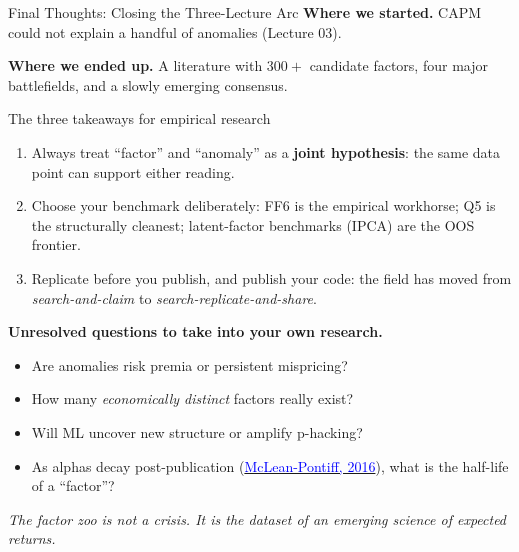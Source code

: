 \documentclass{beamer}
\begin{document}
\begin{frame}{Final Thoughts: Closing the Three-Lecture Arc}
	\textbf{Where we started.} CAPM could not explain a handful of anomalies (Lecture 03).
	\par
	\textbf{Where we ended up.} A literature with $300{+}$ candidate factors, four major battlefields, and a slowly emerging consensus.
	\vspace{6pt}
	\begin{block}{The three takeaways for empirical research}
		\begin{enumerate}
			\item Always treat ``factor'' and ``anomaly'' as a \textbf{joint hypothesis}: the same data point can support either reading.
			\item Choose your benchmark deliberately: FF6 is the empirical workhorse; Q5 is the structurally cleanest; latent-factor benchmarks (IPCA) are the OOS frontier.
			\item Replicate before you publish, and publish your code: the field has moved from \textit{search-and-claim} to \textit{search-replicate-and-share}.
		\end{enumerate}
	\end{block}
	\textbf{Unresolved questions to take into your own research.}
	\begin{itemize}
		\item Are anomalies risk premia or persistent mispricing?
		\item How many \textit{economically distinct} factors really exist?
		\item Will ML uncover new structure or amplify p-hacking?
		\item As alphas decay post-publication (\href{https://doi.org/10.1111/jofi.12365}{\textcolor{blue}{McLean-Pontiff, 2016}}), what is the half-life of a ``factor''?
	\end{itemize}
	\vspace{4pt}
	\begin{center}
		\small \textit{The factor zoo is not a crisis. It is the dataset of an emerging science of expected returns.}
	\end{center}
\end{frame}
\end{document}
